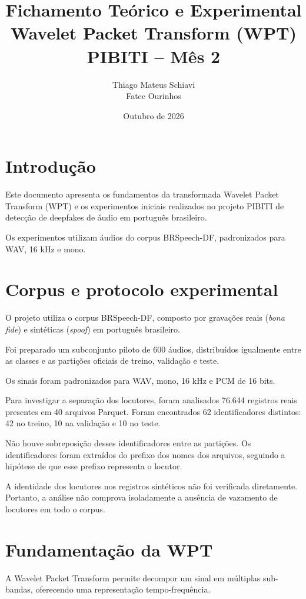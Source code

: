 \documentclass[12pt,a4paper]{article}
\title{
Fichamento Teórico e Experimental\\
\large Wavelet Packet Transform (WPT)\\
PIBITI -- Mês 2
}
\author{Thiago Mateus Schiavi\\
Fatec Ourinhos}
\date{Outubro de 2026}
\begin{document}
\maketitle
\tableofcontents
\newpage

\section{Introdução}

Este documento apresenta os fundamentos da transformada
Wavelet Packet Transform (WPT) e os experimentos iniciais
realizados no projeto PIBITI de detecção de deepfakes
de áudio em português brasileiro.

Os experimentos utilizam áudios do corpus BRSpeech-DF,
padronizados para WAV, 16 kHz e mono.


\section{Corpus e protocolo experimental}

O projeto utiliza o corpus BRSpeech-DF, composto por gravações
reais (\textit{bona fide}) e sintéticas (\textit{spoof}) em
português brasileiro.

Foi preparado um subconjunto piloto de 600 áudios,
distribuídos igualmente entre as classes e as partições
oficiais de treino, validação e teste.

Os sinais foram padronizados para WAV, mono, 16 kHz e PCM
de 16 bits.

Para investigar a separação dos locutores, foram analisados
76.644 registros reais presentes em 40 arquivos Parquet.
Foram encontrados 62 identificadores distintos: 42 no treino,
10 na validação e 10 no teste.

Não houve sobreposição desses identificadores entre as
partições. Os identificadores foram extraídos do prefixo
dos nomes dos arquivos, seguindo a hipótese de que esse
prefixo representa o locutor.

A identidade dos locutores nos registros sintéticos não foi
verificada diretamente. Portanto, a análise não comprova
isoladamente a ausência de vazamento de locutores em todo
o corpus.

\section{Fundamentação da WPT}

A Wavelet Packet Transform permite decompor um sinal
em múltiplas sub-bandas, oferecendo uma representação
tempo-frequência.
\end{document}

